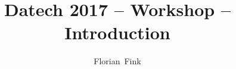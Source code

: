 
\title{Datech 2017 -- \pocoto{} Workshop -- Introduction}
\author{Florian~Fink}



\begin{frame}
	\titlepage
\end{frame}


